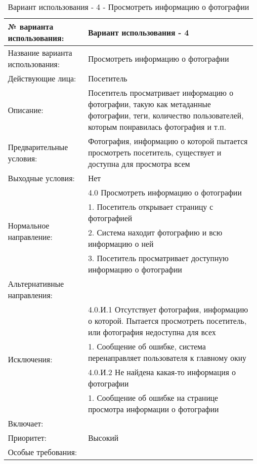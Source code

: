 \begin{table}[H]
  \caption{Вариант использования - 4 - Просмотреть информацию о фотографии}\label{use-case-4-table}
  \begin{tabular}{|p{6cm}|p{10cm}|}
  \hline № варианта использования: & Вариант использования - 4 \\
  \hline Название варианта использования: & Просмотреть информацию о фотографии \\
  \hline Действующие лица: & Посетитель \\
  \hline Описание: & Посетитель просматривает информацию о фотографии, такую как метаданные фотографии, теги, количество пользователей, которым понравилась фотография и т.п.  \\
  \hline Предварительные условия: & Фотография, информацию о которой пытается просмотреть посетитель, существует и доступна для просмотра всем \\
  \hline Выходные условия: & Нет \\
  \hline \multirow{4}{*}{Нормальное направление:} & 4.0 Просмотреть информацию о фотографии \\
  \cline{2-2} & 1. Посетитель открывает страницу с фотографией \\
  \cline{2-2} & 2. Система находит фотографию и всю информацию о ней \\
  \cline{2-2} & 3. Посетитель просматривает доступную информацию о фотографии \\
  \hline Альтернативные направления: &  \\
  \hline \multirow{4}{*}{Исключения:} & 4.0.И.1 Отсутствует фотография, информацию о которой. Пытается просмотреть посетитель, или фотография недоступна для всех \\
  \cline{2-2} & 1. Сообщение об ошибке, система перенаправляет пользователя к главному окну \\
  \cline{2-2} & 4.0.И.2 Не найдена какая-то информация о фотографии \\
  \cline{2-2} & 1. Сообщение об ошибке на странице просмотра информации о фотографии \\
  \hline Включает: &  \\
  \hline Приоритет: & Высокий \\
  \hline Особые требования: & \\
  \hline
  \end{tabular}
\end{table}

